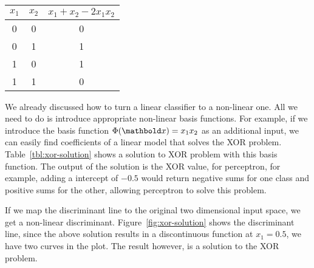 \begin{margintable}
  \caption{\label{tbl:xor-solution}%
    A solution to the XOR problem by introducing a non-linear basis function.
  }
  ~\\[1mm]
  \centering
  \begin{tabular}{SSS}
    \toprule
    {$x_{1}$} &
    {$x_{2}$} &
    {$ x_{1} + x_{2} - 2x_{1}x_{2} $}\\
     & 0 & 0 \\
    0 & 1 & 1 \\
    1 & 0 & 1 \\
    1 & 1 & 0 \\
    \bottomrule
  \end{tabular}
\end{margintable}
We already discussed how to turn a linear classifier to a non-linear one.
All we need to do is introduce appropriate non-linear basis functions.
For example,
if we introduce the basis function $\Phi(\vect{x}) = x_{1}x_{2}$
as an additional input,
we can easily find coefficients of a linear model that solves the XOR problem.
Table~\ref{tbl:xor-solution} shows a solution to XOR problem
with this basis function.
The output of the solution is the XOR value,
for perceptron, for example, adding a intercept of $-0.5$ would
return negative sums for one class and positive sums for the other,
allowing perceptron to solve this problem.
\begin{marginfigure}
  \caption{\label{fig:xor-solution}%
    A visualization of the solution in table~\ref{tbl:xor-solution}.
    Note that the discriminant function is discontinuous at $x_{1} =0.5$. 
  }
\end{marginfigure}
If we map the discriminant line to the original two dimensional input space,
we get a non-linear discriminant.
Figure~\ref{fig:xor-solution} shows the discriminant line,
since the above solution results in a discontinuous function at $x_{1} = 0.5$,
we have two curves in the plot.
The result however, is a solution to the XOR problem.

